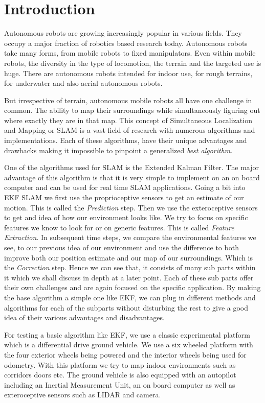 \chapter{Introduction}

	Autonomous robots are growing increasingly popular in various fields. They occupy a major fraction of robotics based research today. Autonomous robots take many forms, from mobile robots to fixed manipulators. Even within mobile robots, the diversity in the type of locomotion, the terrain and the targeted use is huge. There are autonomous robots intended for indoor use, for rough terrains, for underwater and also aerial autonomous robots. 
	
	But irrespective of terrain, autonomous mobile robots all have one challenge in common. The ability to map their surroundings while simultaneously figuring out where exactly they are in that map. This concept of Simultaneous Localization and Mapping or SLAM is a vast field of research with numerous algorithms and implementations. Each of these algorithms, have their unique advantages and drawbacks making it impossible to pinpoint a generalized \textit{best algorithm}. 
	
	One of the algorithms used for SLAM is the Extended Kalman Filter. The major advantage of this algorithm is that it is very simple to implement on an on board computer and can be used for real time SLAM applications. Going a bit into EKF SLAM we first use the proprioceptive sensors to get an estimate of our motion. This is called the \textit{Prediction} step. Then we use the exteroceptive sensors to get and idea of how our environment looks like. We try to focus on specific features we know to look for or on generic features. This is called \textit{Feature Extraction}. In subsequent time steps, we compare the environmental features we see, to our previous idea of our environment and use the difference to both improve both our position estimate and our map of our surroundings. Which is the \textit{Correction} step. Hence we can see that, it consists of many sub parts within it which we shall discuss in depth at a later point. Each of these sub parts offer their own challenges and are again focused on the specific application. By making the base algorithm a simple one like EKF, we can plug in different methods and algorithms for each of the subparts without disturbing the rest to give a good idea of their various advantages and disadvantages. 
	
	For testing a basic algorithm like EKF, we use a classic experimental platform which is a differential drive ground vehicle. We use a six wheeled platform with the four exterior wheels being powered and the interior wheels being used for odometry. With this platform we try to map indoor environments such as corridors doors etc. The ground vehicle is also equipped with an autopilot including an Inertial Measurement Unit, an on board computer as well as exteroceptive sensors such as LIDAR and camera.
	
